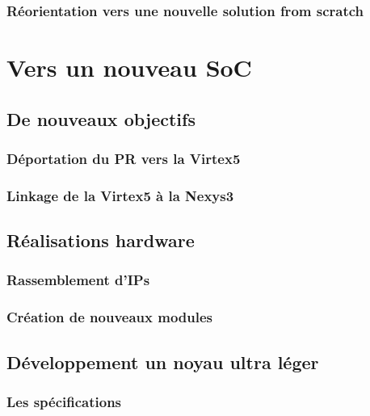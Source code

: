 \documentclass[a4paper]{report}
\begin{document}
\subsection{Réorientation vers une nouvelle solution from scratch}
 \newpage

\chapter{Vers un nouveau SoC}

\section{De nouveaux objectifs}

\subsection{Déportation du PR vers la Virtex5}
 \newpage

\subsection{Linkage de la Virtex5 à la Nexys3}
 \newpage

\section{Réalisations hardware}

\subsection{Rassemblement d'IPs}
 \newpage

\subsection{Création de nouveaux modules}
 \newpage

\section{Développement un noyau ultra léger}

\subsection{Les spécifications}
 \newpage
\end{document}
